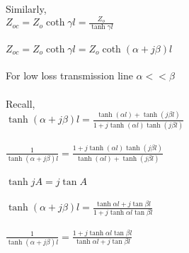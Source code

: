 	Similarly,\\
	 $ Z_{oc}=Z_{o}\coth\gamma l=\frac{Z_{o}}{\tanh\gamma l} $\\\\
	$ Z_{oc}=Z_{o}\coth\gamma l=Z_{o}\coth(\alpha+j\beta) l $\\\\
	For low loss transmission line $ \alpha<<\beta $ \\\\Recall,\\
	$ \tanh(\alpha+j\beta)l=\frac{\tanh (\alpha l) + \tanh (j\beta l)}{1 +j \tanh (\alpha l)\tanh (j\beta l)} $\\\\
	$ \frac{1}{\tanh(\alpha+j\beta)l}=\frac{1 + j\tanh (\alpha l)\tanh (j\beta l)}{\tanh (\alpha l) + \tanh (j\beta l)} $\\\\
	$ \tanh jA= j \tan A $\\\\
	$ \tanh(\alpha+j\beta)l=\frac{\tanh \alpha l+j\tan \beta l}{1+j\tanh \alpha l\tan \beta l} $\\\\
	$ \frac{1}{\tanh(\alpha+j\beta)l}=\frac{1+j\tanh \alpha l\tan \beta l}{\tanh \alpha l+j\tan \beta l} $
	

